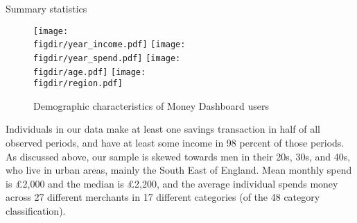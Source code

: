 \begin{table}[ht]
\centering\scriptsize
\caption{Summary statistics}
\label{tab:sumstats}

\end{table}

\begin{figure}[ht]
    \centering
    \caption{Demographic characteristics of Money Dashboard users}
    \label{fig:sample_desc}
    \texttt{[image: \\figdir/year\_income.pdf]}
    \texttt{[image: \\figdir/year\_spend.pdf]}
    \texttt{[image: \\figdir/age.pdf]}
    \texttt{[image: \\figdir/region.pdf]}
\end{figure}

Individuals in our data make at least one savings transaction in half of all
observed periods, and have at least some income in 98 percent of those periods.
As discussed above, our sample is skewed towards men in their 20s, 30s, and
40s, who live in urban areas, mainly the South East of England. Mean monthly
spend is \pounds2,000 and the median is \pounds2,200, and the average
individual spends money across 27 different merchants in 17 different
categories (of the 48 category classification).

